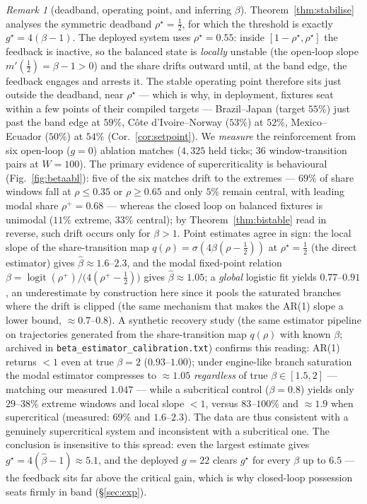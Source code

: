 \documentclass[11pt]{article}
\theoremstyle{definition}
\theoremstyle{remark}
\newtheorem{remark}{Remark}
\begin{document}
\begin{remark}[deadband, operating point, and inferring $\beta$]\label{rem:deadband}
Theorem~\ref{thm:stabilise} analyses the symmetric deadband $\rho^\star=\tfrac12$, for which the threshold is exactly $g^\star=4(\beta-1)$. The deployed system uses $\rho^\star=0.55$: inside $[1-\rho^\star,\rho^\star]$ the feedback is inactive, so the balanced state is \emph{locally} unstable (the open-loop slope $m'(\tfrac12)=\beta-1>0$) and the share drifts outward until, at the band edge, the feedback engages and arrests it. The stable operating point therefore sits just outside the deadband, near $\rho^\star$ --- which is why, in deployment, fixtures seat within a few points of their compiled targets --- Brazil--Japan (target $55\%$) just past the band edge at $59\%$, C\^ote d'Ivoire--Norway ($53\%$) at $52\%$, Mexico--Ecuador ($50\%$) at $54\%$ (Cor.~\ref{cor:setpoint}). We \emph{measure} the reinforcement from six open-loop ($g=0$) ablation matches ($4{,}325$ held ticks; $36$ window-transition pairs at $W=100$). The primary evidence of supercriticality is behavioural (Fig.~\ref{fig:betaabl}): five of the six matches drift to the extremes --- $69\%$ of share windows fall at $\rho\le0.35$ or $\rho\ge0.65$ and only $5\%$ remain central, with leading modal share $\rho^+=0.68$ --- whereas the closed loop on balanced fixtures is unimodal ($11\%$ extreme, $33\%$ central); by Theorem~\ref{thm:bistable} read in reverse, such drift occurs only for $\beta>1$. Point estimates agree in sign: the local slope of the share-transition map $q(\rho)=\sigma(4\beta(\rho-\tfrac12))$ at $\rho^\star=\tfrac12$ (the direct estimator) gives $\hat\beta\approx1.6$--$2.3$, and the modal fixed-point relation $\beta=\operatorname{logit}(\rho^+)/\big(4(\rho^+-\tfrac12)\big)$ gives $\hat\beta\approx1.05$; a \emph{global} logistic fit yields $0.77$--$0.91$, an underestimate by construction here since it pools the saturated branches where the drift is clipped (the same mechanism that makes the AR(1) slope a lower bound, $\approx0.7$--$0.8$). A synthetic recovery study (the same estimator pipeline on trajectories generated from the share-transition map $q(\rho)$ with known $\beta$; archived in \texttt{beta\_estimator\_calibration.txt}) confirms this reading: AR(1) returns $<1$ even at true $\beta=2$ ($0.93$--$1.00$); under engine-like branch saturation the modal estimator compresses to $\approx1.05$ \emph{regardless} of true $\beta\in[1.5,2]$ --- matching our measured $1.047$ --- while a subcritical control ($\beta=0.8$) yields only $29$--$38\%$ extreme windows and local slope $<1$, versus $83$--$100\%$ and $\approx1.9$ when supercritical (measured: $69\%$ and $1.6$--$2.3$). The data are thus consistent with a genuinely supercritical system and inconsistent with a subcritical one. The conclusion is insensitive to this spread: even the largest estimate gives $g^\star=4(\hat\beta-1)\approx5.1$, and the deployed $g=22$ clears $g^\star$ for every $\beta$ up to $6.5$ --- the feedback sits far above the critical gain, which is why closed-loop possession seats firmly in band (\S\ref{sec:exp}).
\end{remark}
\end{document}
